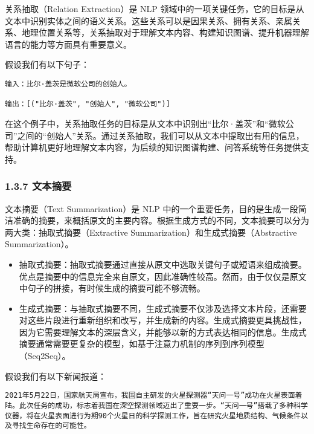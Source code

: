 \documentclass[12pt,a4paper]{book}
\begin{document}
关系抽取（Relation Extraction）是 NLP
领域中的一项关键任务，它的目标是从文本中识别实体之间的语义关系。这些关系可以是因果关系、拥有关系、亲属关系、地理位置关系等，关系抽取对于理解文本内容、构建知识图谱、提升机器理解语言的能力等方面具有重要意义。

假设我们有以下句子：

\begin{verbatim}
输入：比尔·盖茨是微软公司的创始人。

输出：[("比尔·盖茨", "创始人", "微软公司")]
\end{verbatim}

在这个例子中，关系抽取任务的目标是从文本中识别出``比尔·盖茨''和``微软公司''之间的``创始人''关系。通过关系抽取，我们可以从文本中提取出有用的信息，帮助计算机更好地理解文本内容，为后续的知识图谱构建、问答系统等任务提供支持。

\subsubsection{1.3.7 文本摘要}\label{ux6587ux672cux6458ux8981}

文本摘要（Text Summarization）是 NLP
中的一个重要任务，目的是生成一段简洁准确的摘要，来概括原文的主要内容。根据生成方式的不同，文本摘要可以分为两大类：抽取式摘要（Extractive
Summarization）和生成式摘要（Abstractive Summarization）。

\begin{itemize}
\tightlist
\item
  抽取式摘要：抽取式摘要通过直接从原文中选取关键句子或短语来组成摘要。优点是摘要中的信息完全来自原文，因此准确性较高。然而，由于仅仅是原文中句子的拼接，有时候生成的摘要可能不够流畅。
\item
  生成式摘要：与抽取式摘要不同，生成式摘要不仅涉及选择文本片段，还需要对这些片段进行重新组织和改写，并生成新的内容。生成式摘要更具挑战性，因为它需要理解文本的深层含义，并能够以新的方式表达相同的信息。生成式摘要通常需要更复杂的模型，如基于注意力机制的序列到序列模型（Seq2Seq）。
\end{itemize}

假设我们有以下新闻报道：

\begin{verbatim}
2021年5月22日，国家航天局宣布，我国自主研发的火星探测器“天问一号”成功在火星表面着陆。此次任务的成功，标志着我国在深空探测领域迈出了重要一步。“天问一号”搭载了多种科学仪器，将在火星表面进行为期90个火星日的科学探测工作，旨在研究火星地质结构、气候条件以及寻找生命存在的可能性。
\end{verbatim}
\end{document}
